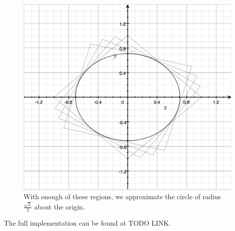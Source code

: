\begin{figure}[H] 
\includegraphics[width=\linewidth]{dist3.png}
\caption{With enough of these regions, we approximate the circle of radius $\frac{\sqrt{2}}{2}$ about the origin.}
\label{dist3}
\end{figure}

The full implementation can be found at TODO LINK.

